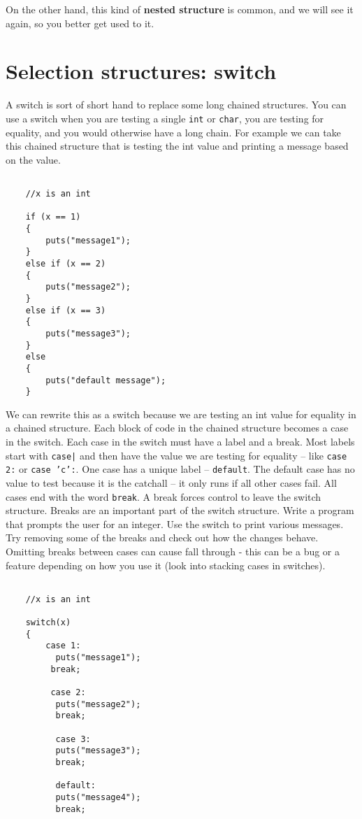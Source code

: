 On the other hand, this kind of {\bf nested structure} is common, and
we will see it again, so you better get used to it.


\section{Selection structures: switch}

A switch is sort of short hand to replace some long chained structures. 
You can use a switch when you are testing a single {\tt int} or {\tt char}, you
are testing for equality, and you would otherwise have a long chain. For example we can take this chained structure that is testing the 
int value and printing a message based on the value.

\begin{verbatim}
	
	//x is an int
	
	if (x == 1) 
	{
		puts("message1");
	} 
	else if (x == 2) 
	{
		puts("message2");
	} 
	else if (x == 3) 
	{
		puts("message3");
	} 
	else 
	{
		puts("default message");
	}
\end{verbatim}
%

We can rewrite this as a switch because we are testing an int value for equality in a chained structure. Each block of code in the chained structure 
becomes a case in the switch. Each case in the switch must have a label and a break. Most labels start with {\tt case|} and then have the value we are testing for equality --
like {\tt case 2:} or {\tt case 'c':}. One case has a unique label -- {\tt default}. The default case has no value to test because it is the catchall -- it only runs if all other cases fail. All cases end with the word {\tt break}. A break forces control to leave the switch structure. Breaks are an important part of the switch structure.
Write a program that prompts the user for an integer. Use the switch to print various messages. Try removing some of the breaks and  check out how the changes behave.
Omitting breaks between cases can cause fall through - this can be a bug or a feature depending on how you use it (look into stacking cases in switches).


\begin{verbatim}
	
	//x is an int
	
	switch(x)
	{
		case 1:
		  puts("message1");
		 break;
		
		 case 2:
		  puts("message2");
		  break;
		
		  case 3:
		  puts("message3");
		  break;
		
		  default:
		  puts("message4");
		  break;
		
	\end{verbatim}

